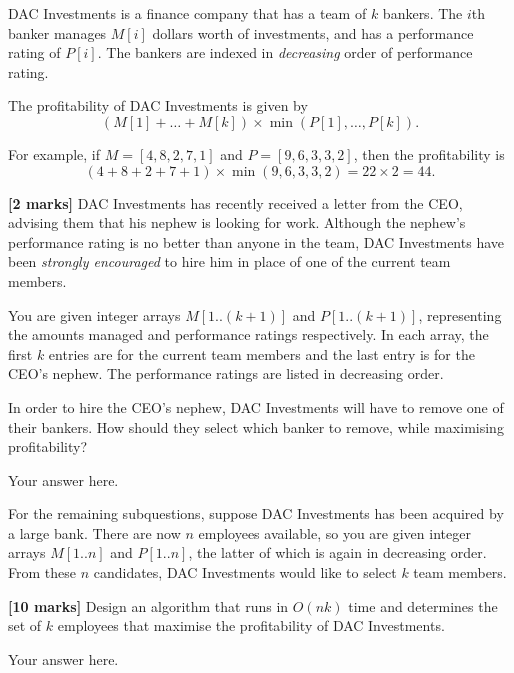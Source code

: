\documentclass{article}
\begin{document}
\setcounter{question}{1}

\begin{Question}
DAC Investments is a finance company that has a team of $k$ bankers. The $i$th banker manages $M[i]$ dollars worth of investments, and has a performance rating of $P[i]$. The bankers are indexed in \emph{decreasing} order of performance rating.

The profitability of DAC Investments is given by \[(M[1] + \ldots + M[k]) \times \min(P[1],\ldots, P[k]).\]

For example, if $M = [4,8,2,7,1]$ and $P = [9,6,3,3,2]$, then the profitability is \[ (4+8+2+7+1)\times \min(9, 6, 3, 3, 2) = 22\times 2 = 44. \]

\begin{Subquestion}
\textbf{[2 marks]} DAC Investments has recently received a letter from the CEO, advising them that his nephew is looking for work. Although the nephew's performance rating is no better than anyone in the team, DAC Investments have been \emph{strongly encouraged} to hire him in place of one of the current team members.

You are given integer arrays $M[1..(k+1)]$ and $P[1..(k+1)]$, representing the amounts managed and performance ratings respectively. In each array, the first $k$ entries are for the current team members and the last entry is for the CEO's nephew. The performance ratings are listed in decreasing order.

In order to hire the CEO's nephew, DAC Investments will have to remove one of their bankers. How should they select which banker to remove, while maximising profitability?

\begin{answer}
Your answer here.
\end{answer}
\end{Subquestion}

For the remaining subquestions, suppose DAC Investments has been acquired by a large bank. There are now $n$ employees available, so you are given integer arrays $M[1..n]$ and $P[1..n]$, the latter of which is again in decreasing order. From these $n$ candidates, DAC Investments would like to select $k$ team members.

\begin{Subquestion}\label{investment-nk}
\textbf{[10 marks]} Design an algorithm that runs in $O(nk)$ time and determines the set of $k$ employees that maximise the profitability of DAC Investments.

\begin{answer}
Your answer here.
\end{answer}
\end{Subquestion}


\end{Question}
\end{document}
